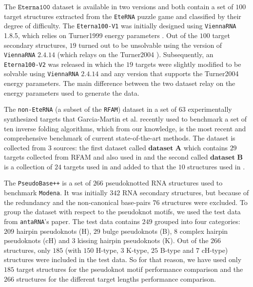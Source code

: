 The \(\texttt{Eterna100}\) dataset \cite{Eterna} is available in two versions and both contain a set of \(100\) target structures extracted from the \texttt{EteRNA} puzzle game and classified by their degree of difficulty. The \texttt{Eterna100-V1} was initially designed using \texttt{ViennaRNA} 1.8.5, which relies on Turner1999 energy parameters \cite{Turn1999}. Out of the $100$ target secondary structures, $19$ turned out to be unsolvable using the version of \texttt{ViennaRNA} $2.4.14$ (which relays on the Turner2004 \cite{mathews2004incorporating}). Subsequently, an \texttt{Eterna100-V2} \cite{Eterna} was released in which the $19$ targets were slightly modified to be solvable using \texttt{ViennaRNA} $2.4.14$ and any version that supports the Turner2004 energy parameters. The main difference between the two dataset relay on the energy parameters used to generate the data.

The \texttt{non-EteRNA} (a subset of the \texttt{RFAM}) dataset in a set of \(63\) experimentally synthesized targets that Garcia-Martin et al. \cite{garcia2013rnaifold} recently used to benchmark a set of ten inverse folding algorithms, which from our knowledge, is the most recent and comprehensive benchmark of current state-of-the-art methods. The dataset is collected from \(3\) sources: the first dataset called \(\textbf{dataset A}\) which contains \(29\) targets collected from RFAM and also used in \cite{esmaili2015erd,taneda2011modena} and the second called \(\textbf{dataset B}\) is a collection of \(24\) targets used in \cite{esmaili2015erd} and added to that the \(10\) structures used in \cite{shi2018sentrna}.

The \texttt{PseudoBase++} is a set of $266$ pseudoknotted \ac{RNA} structures used to benchmark \texttt{Modena}. It was initially $342$ \ac{RNA} secondary structures, but because of the redundancy and the non-canonical base-pairs  $76$ structures were excluded. To group the dataset with respect to the pseudoknot motifs, we used the test data from \texttt{antaRNA}'s paper. The test data contains $249$ grouped into four categories: $209$ hairpin pseudoknots (H), $29$ bulge pseudoknots (B), $8$ complex hairpin pseudoknots (cH) and $3$ kissing hairpin pseudoknots (K). Out of the $266$ structures, only $185$ (with $150$ H-type, $3$ K-type, $25$ B-type and $7$ cH-type) structures were included in the test data. So for that reason, we have used only $185$ target structures for the pseudoknot motif performance comparison and the $266$ structures for the different target lengths performance comparison.

